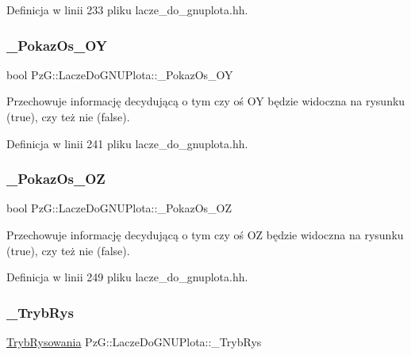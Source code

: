 Definicja w linii 233 pliku lacze\+\_\+do\+\_\+gnuplota.\+hh.

\mbox{\label{class_pz_g_1_1_lacze_do_g_n_u_plota_ae8d9b4dac5eae6ce86b7043c45b70ed8}} 
\subsubsection{\texorpdfstring{\_PokazOs\_OY}{\_PokazOs\_OY}}
{\footnotesize\ttfamily bool Pz\+G\+::\+Lacze\+Do\+G\+N\+U\+Plota\+::\+\_\+\+Pokaz\+Os\+\_\+\+OY\hspace{0.3cm}{\ttfamily [protected]}}

Przechowuje informację decydującą o tym czy oś OY będzie widoczna na rysunku ({\ttfamily true}), czy też nie ({\ttfamily false}). 

Definicja w linii 241 pliku lacze\+\_\+do\+\_\+gnuplota.\+hh.

\mbox{\label{class_pz_g_1_1_lacze_do_g_n_u_plota_a5b0afc06dc248790d2e7475b2162e309}} 
\subsubsection{\texorpdfstring{\_PokazOs\_OZ}{\_PokazOs\_OZ}}
{\footnotesize\ttfamily bool Pz\+G\+::\+Lacze\+Do\+G\+N\+U\+Plota\+::\+\_\+\+Pokaz\+Os\+\_\+\+OZ\hspace{0.3cm}{\ttfamily [protected]}}

Przechowuje informację decydującą o tym czy oś OZ będzie widoczna na rysunku ({\ttfamily true}), czy też nie ({\ttfamily false}). 

Definicja w linii 249 pliku lacze\+\_\+do\+\_\+gnuplota.\+hh.

\mbox{\label{class_pz_g_1_1_lacze_do_g_n_u_plota_a00e3a51bb47d3fb26eee875dc48215db}} 
\subsubsection{\texorpdfstring{\_TrybRys}{\_TrybRys}}
{\footnotesize\ttfamily \mbox{\hyperlink{namespace_pz_g_aeedae1ef10c66d720f9e89de408ca4ca}{Tryb\+Rysowania}} Pz\+G\+::\+Lacze\+Do\+G\+N\+U\+Plota\+::\+\_\+\+Tryb\+Rys\hspace{0.3cm}{\ttfamily [protected]}}

